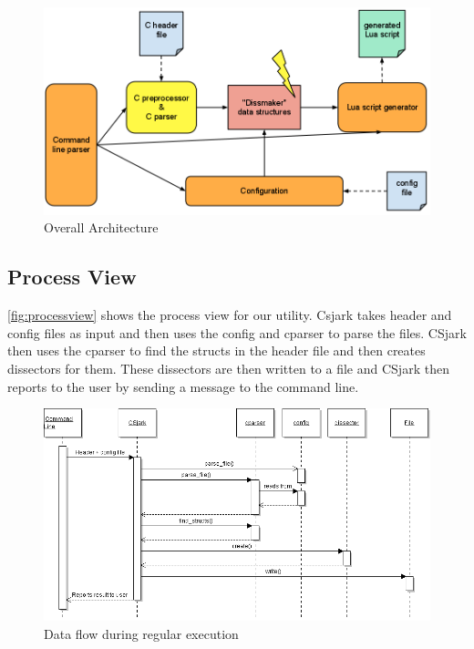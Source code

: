 \begin{figure}[htb]
	\includegraphics[width=\textwidth]{./planning/img/overall_design}
	\caption{Overall Architecture\label{fig:logicalview}}
\end{figure}

\subsection{Process View}
\autoref{fig:processview} shows the process view for our \gls{utility}. Csjark takes \gls{header} and config files as input and then uses the config and cparser to parse the files. CSjark then uses the cparser to find the \glspl{struct} in the \gls{header} file and then creates \glspl{dissector} for them. These \glspl{dissector} are then written to a file and CSjark then reports to the user by sending a message to the command line.

\begin{figure}[htb]
	\includegraphics[width=\textwidth]{./planning/img/SequenceDiagram}
	\caption{Data flow during regular execution\label{fig:processview}}
\end{figure}


